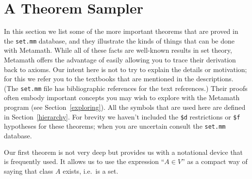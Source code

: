
\section{A Theorem Sampler}\label{sometheorems}

In this section we list some of the more important theorems that are proved in
the \texttt{set.mm} database, and they illustrate the kinds of things that can be
done with Metamath.  While all of these facts are well-known results in set
theory, Metamath offers the advantage of easily allowing you to trace their
derivation back to axioms.  Our intent here is not to try to explain the
details or motivation; for this we refer you to the textbooks that are
mentioned in the descriptions.  (The \texttt{set.mm} file has bibliographic
references for the text references.)  Their proofs often embody important
concepts you may wish to explore with the Metamath program (see
Section~\ref{exploring}).  All the symbols that are used here are defined in
Section~\ref{hierarchy}.  For brevity we haven't included the \texttt{\$d}
restrictions or \texttt{\$f} hypotheses for these theorems; when you are
uncertain consult the \texttt{set.mm} database.

Our first theorem is not very deep but provides us with a notational device
that is frequently used.  It allows us to use the expression ``$A \in V$'' as
a compact way of saying that class $A$ exists, i.e.\ is a set.

